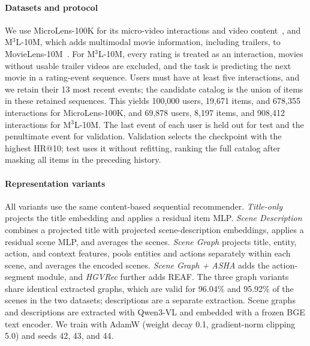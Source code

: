 \paragraph{Datasets and protocol}
We use MicroLens-100K for its micro-video interactions and video content~\cite{ni2025microlens}, and M$^3$L-10M, which adds multimodal movie information, including trailers, to MovieLens-10M~\cite{spillo2026bingewatch}.
For M$^3$L-10M, every rating is treated as an interaction, movies without usable trailer videos are excluded, and the task is predicting the next movie in a rating-event sequence.
Users must have at least five interactions, and we retain their 13 most recent events; the candidate catalog is the union of items in these retained sequences.
This yields 100,000 users, 19,671 items, and 678,355 interactions for MicroLens-100K, and 69,878 users, 8,197 items, and 908,412 interactions for M$^3$L-10M.
The last event of each user is held out for test and the penultimate event for validation.
Validation selects the checkpoint with the highest HR@10; test uses it without refitting, ranking the full catalog after masking all items in the preceding history.

\paragraph{Representation variants}
All variants use the same content-based sequential recommender.
\emph{Title-only} projects the title embedding and applies a residual item MLP.
\emph{Scene Description} combines a projected title with projected scene-description embeddings, applies a residual scene MLP, and averages the scenes.
\emph{Scene Graph} projects title, entity, action, and context features, pools entities and actions separately within each scene, and averages the encoded scenes.
\emph{Scene Graph + ASHA} adds the action-segment module, and \emph{HGVRec} further adds REAF.
The three graph variants share identical extracted graphs, which are valid for 96.04\% and 95.92\% of the scenes in the two datasets; descriptions are a separate extraction.
Scene graphs and descriptions are extracted with Qwen3-VL and embedded with a frozen BGE text encoder.
We train with AdamW (weight decay 0.1, gradient-norm clipping 5.0) and seeds 42, 43, and 44.

